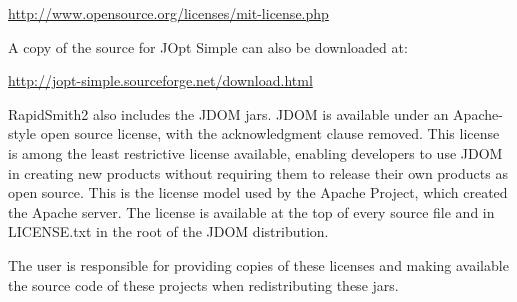 \noindent
\hyperref[http://www.opensource.org/licenses/mit-license.php]{\color{blue}http://www.opensource.org/licenses/mit-license.php}

\bigbreak \noindent   
A copy of the source for JOpt Simple can also be downloaded at:

\noindent
\hyperref[http://jopt-simple.sourceforge.net/download.html]{\color{blue}http://jopt-simple.sourceforge.net/download.html}

\bigbreak \noindent
RapidSmith2 also includes the JDOM jars.  JDOM is available under an Apache-style open
source license, with the acknowledgment clause removed. This license is among
the least restrictive license available, enabling developers to use JDOM in
creating new products without requiring them to release their own products as
open source. This is the license model used by the Apache Project, which created
the Apache server. The license is available at the top of every source file and
in LICENSE.txt in the root of the JDOM distribution.              

\bigbreak \noindent
The user is responsible for providing copies of these licenses and making
available the source code of these projects when redistributing these jars.